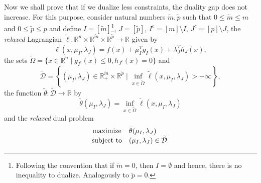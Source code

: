 \documentclass[smallextended,referee,envcountsect]{svjour3}
\newcommand{\R}{\mathbb{R}}
\begin{document}
Now we shall prove that if we dualize less constraints, the duality gap does not increase. 
For this purpose, consider natural numbers $\tilde{m}, \tilde{p}$ such that 
$0\leq\tilde{m}\leq m$ and $0\leq\tilde{p}\leq p$ and define 
$I=[\tilde{m}]$\footnote{Following the convention that if $\tilde{m}=0$, then 
$I=\emptyset$ and hence, there is no inequality to dualize. Analogously to $\tilde{p}=0$.}, 
$J=[\tilde{p}]$, 
$I^c=[m]\setminus{I}$, $J^c=[p]\setminus{J}$, the {\em relaxed} Lagrangian 
$\tilde\ell:\R^n\times\R^{\tilde{m}}\times\R^{\tilde{p}}\to\R$ given by
$$
\tilde\ell(x,\mu_I,\lambda_J)=f(x)+\mu_I^Tg_I(x)+\lambda_J^Th_J(x),
$$
the sets $\widetilde\Omega = \{x\in\R^n\mid g_{I^c}(x)\leq 0, h_{J^c}(x)=0\}$ and 
$$
\mathcal{\widetilde D}=
\left\{(\mu_I,\lambda_J)\in\R^{\tilde{m}}_+\times\R^{\tilde{p}}\mid\inf_{x\in\widetilde\Omega}
\tilde\ell(x,\mu_I,\lambda_J)>-\infty\right\},
$$
the function $\tilde\theta:\mathcal{\widetilde D}\to\R$ by 
$$
\tilde\theta(\mu_I,\lambda_J)=\inf_{x\in\widetilde\Omega}\tilde\ell(x,\mu_I,\lambda_J)
$$ 
and the {\em relaxed} dual problem 
\begin{equation}
\label{relaxed_dual_problem}
\begin{array}{cl}
\displaystyle\mathop{\rm maximize }  & \tilde\theta(\mu_I,\lambda_J) \\
{\rm subject\ to } & (\mu_I,\lambda_J)\in\mathcal{\widetilde D}.
\end{array}
\end{equation}
\end{document}
